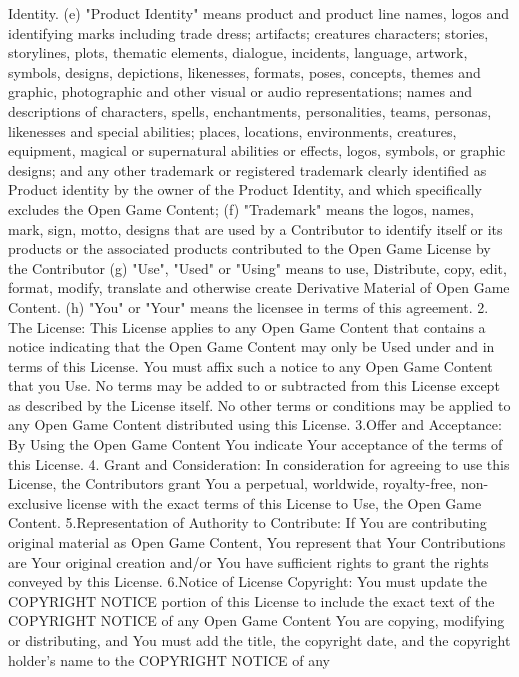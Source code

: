 \begin{multicols}{2}
Identity. (e) "Product Identity" means product
and product line names, logos and identifying
marks including trade dress; artifacts; creatures
characters; stories, storylines, plots, thematic
elements, dialogue, incidents, language, artwork,
symbols, designs, depictions, likenesses, formats,
poses, concepts, themes and graphic,
photographic and other visual or audio
representations; names and descriptions of
characters, spells, enchantments, personalities,
teams, personas, likenesses and special abilities;
places, locations, environments, creatures,
equipment, magical or supernatural abilities or
effects, logos, symbols, or graphic designs; and
any other trademark or registered trademark
clearly identified as Product identity by the
owner of the Product Identity, and which
specifically excludes the Open Game Content; (f)
"Trademark" means the logos, names, mark, sign,
motto, designs that are used by a Contributor to
identify itself or its products or the associated
products contributed to the Open Game License
by the Contributor (g) "Use", "Used" or "Using"
means to use, Distribute, copy, edit, format,
modify, translate and otherwise create Derivative
Material of Open Game Content. (h) "You" or
"Your" means the licensee in terms of this
agreement.
2. The License: This License applies to any Open
Game Content that contains a notice indicating
that the Open Game Content may only be Used
under and in terms of this License. You must affix
such a notice to any Open Game Content that
you Use. No terms may be added to or
subtracted from this License except as described
by the License itself. No other terms or conditions
may be applied to any Open Game Content
distributed using this License.
3.Offer and Acceptance: By Using the Open Game
Content You indicate Your acceptance of the
terms of this License.
4. Grant and Consideration: In consideration for
agreeing to use this License, the Contributors
grant You a perpetual, worldwide, royalty-free,
non-exclusive license with the exact terms of this
License to Use, the Open Game Content.
5.Representation of Authority to Contribute: If
You are contributing original material as Open
Game Content, You represent that Your
Contributions are Your original creation and/or
You have sufficient rights to grant the rights
conveyed by this License.
6.Notice of License Copyright: You must update
the COPYRIGHT NOTICE portion of this License to
include the exact text of the COPYRIGHT NOTICE
of any Open Game Content You are copying,
modifying or distributing, and You must add the
title, the copyright date, and the copyright 
holder's name to the COPYRIGHT NOTICE of any

\end{multicols}
